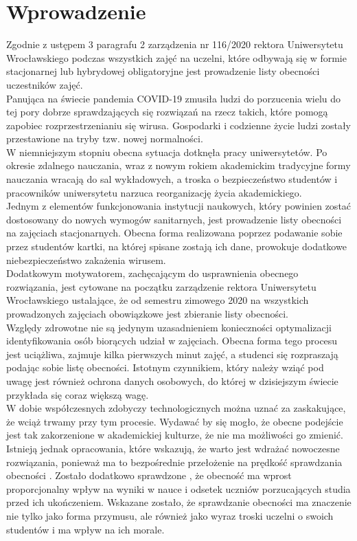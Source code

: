 \documentclass[declaration,shortabstract, mgr]{iithesis}
\author {Dawid Szczyrk}
\begin{document}
\chapter{Wprowadzenie}


\indent Zgodnie z ustępem 3 paragrafu 2 zarządzenia nr 116/2020 rektora Uniwersytetu Wrocławskiego \cite{uwr} podczas wszystkich zajęć na uczelni, które odbywają się w formie stacjonarnej lub hybrydowej obligatoryjne jest prowadzenie listy obecności uczestników zajęć.\\
\indent Panująca na świecie pandemia COVID-19 zmusiła ludzi do porzucenia wielu do tej pory dobrze sprawdzających się rozwiązań na rzecz takich, które pomogą zapobiec rozprzestrzenianiu się wirusa. Gospodarki i codzienne życie ludzi zostały przestawione na tryby tzw. nowej normalności.\\
\indent W niemniejszym stopniu obecna sytuacja dotknęła pracy uniwersytetów. Po okresie zdalnego nauczania, wraz z nowym rokiem akademickim tradycyjne formy nauczania wracają do sal wykładowych, a troska o bezpieczeństwo studentów i pracowników uniwersytetu narzuca reorganizację życia akademickiego.\\
\indent Jednym z elementów funkcjonowania instytucji naukowych, który powinien zostać dostosowany do nowych wymogów sanitarnych, jest prowadzenie listy obecności na zajęciach stacjonarnych. Obecna forma realizowana poprzez podawanie sobie przez studentów kartki, na której spisane zostają ich dane, prowokuje dodatkowe niebezpieczeństwo zakażenia wirusem. \\
\indent Dodatkowym motywatorem, zachęcającym do usprawnienia obecnego rozwiązania, jest cytowane na początku zarządzenie rektora Uniwersytetu Wrocławskiego ustalające, że od semestru zimowego 2020 na wszystkich prowadzonych zajęciach obowiązkowe jest zbieranie listy obecności. \\
\indent Względy zdrowotne nie są jedynym uzasadnieniem konieczności optymalizacji identyfikowania osób biorących udział w zajęciach. Obecna forma tego procesu jest uciążliwa, zajmuje kilka pierwszych minut zajęć, a studenci się rozpraszają podając sobie listę obecności. Istotnym czynnikiem, który należy wziąć pod uwagę jest również ochrona danych osobowych, do której w dzisiejszym świecie przykłada się coraz większą wagę.\\
\indent W dobie współczesnych zdobyczy technologicznych można uznać za zaskakujące, że wciąż trwamy przy tym procesie. Wydawać by się mogło, że obecne podejście jest tak zakorzenione w akademickiej kulturze, że nie ma możliwości go zmienić. Istnieją jednak opracowania, które wskazują, że warto jest wdrażać nowoczesne rozwiązania, ponieważ ma to bezpośrednie przełożenie na prędkość sprawdzania obecności \cite{lcd}. Zostało dodatkowo sprawdzone \cite{theory_base}, że obecność ma wprost proporcjonalny wpływ na wyniki w nauce i odsetek uczniów porzucających studia przed ich ukończeniem. Wskazane zostało, że sprawdzanie obecności ma znaczenie nie tylko jako forma przymusu, ale również jako wyraz troski uczelni o swoich studentów i ma wpływ na ich morale.\\
\end{document}
